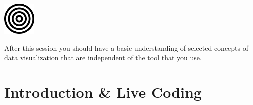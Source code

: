 \documentclass[aspectratio=169]{beamer}
\begin{document}
\begin{frame}
  \begin{block}{}
    \vspace{0.5cm}
    \ \ \ \
    \begin{minipage}{0.10\textwidth}
      \begin{center}
        \includegraphics[width=1.6cm]{images/publicdomainvectors_target-plain.pdf}
      \end{center}        
    \end{minipage}
    \hfill
    \begin{minipage}{0.80\textwidth}
      After this session you should have a basic understanding of
      selected concepts of data visualization that are independent
      of the tool that you use.
    \end{minipage}
    \vspace{0.3cm}
  \end{block}
\end{frame}

\section{Introduction \& Live Coding}

\begin{frame}{}
 \tableofcontents
\end{frame}

\begin{frame}{}
  \tableofcontents[currentsection]
\end{frame}
\end{document}
